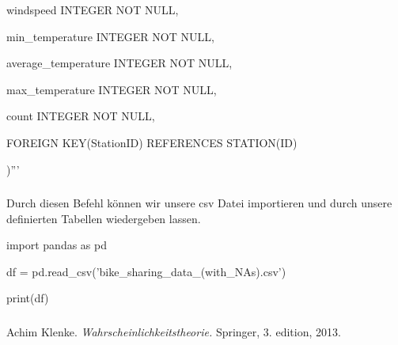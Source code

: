 \documentclass{article}
\begin{document}
windspeed INTEGER NOT NULL,
 
 min\_temperature INTEGER NOT NULL,
 
average\_temperature INTEGER NOT NULL,
 
 max\_temperature INTEGER NOT NULL,
 
 count INTEGER NOT NULL,
  
 FOREIGN KEY(StationID) REFERENCES STATION(ID)

)'''


\subsubsection{}

Durch diesen Befehl können wir unsere csv Datei importieren und durch unsere definierten Tabellen wiedergeben lassen.

import pandas as pd

df = pd.read\_csv('bike\_sharing\_data\_(with\_NAs).csv')

print(df)

\subsubsection{}

\newpage
\renewcommand{\refname}{Literatur}
\begin{thebibliography}{9}
 Achim Klenke. \emph{Wahrscheinlichkeitstheorie.} Springer, 3. edition, 2013.
\end{thebibliography}
\end{document}
